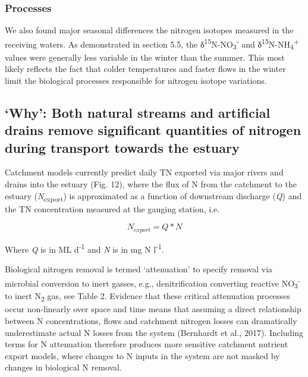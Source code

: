\documentclass[
]{book}
\begin{document}
\hypertarget{processes}{%
\subsubsection{Processes}\label{processes}}

We also found major seasonal differences the nitrogen isotopes measured in the receiving waters. As demonstrated in section 5.5, the δ\textsuperscript{15}N-NO\textsubscript{3}\textsuperscript{-} and δ\textsuperscript{15}N-NH\textsubscript{4}\textsuperscript{+} values were generally less variable in the winter than the summer. This most likely reflects the fact that colder temperatures and faster flows in the winter limit the biological processes responsible for nitrogen isotope variations.~

\hypertarget{why-both-natural-streams-and-artificial-drains-remove-significant-quantities-of-nitrogen-during-transport-towards-the-estuary}{%
\subsection{`Why': Both natural streams and artificial drains remove significant quantities of nitrogen during transport towards the estuary}\label{why-both-natural-streams-and-artificial-drains-remove-significant-quantities-of-nitrogen-during-transport-towards-the-estuary}}

Catchment models currently predict daily TN exported via major rivers and drains into the estuary (Fig. 12), where the flux of N from the catchment to the estuary (\emph{N}\textsubscript{export}) is approximated as a function of downstream discharge (\emph{Q}) and the TN concentration measured at the gauging station, i.e.~

\[
N_{export} = Q*N
\]

Where \emph{Q} is in ML d\textsuperscript{-1} and \emph{N} is in mg N l\textsuperscript{-1}.~

Biological nitrogen removal is termed `attenuation' to specify removal via microbial conversion to inert gasses, e.g., denitrification converting reactive NO\textsubscript{3}\textsuperscript{-} to inert N\textsubscript{2} gas, see Table 2. Evidence that these critical attenuation processes occur non-linearly over space and time means that assuming a direct relationship between N concentrations, flows and catchment nitrogen losses can dramatically underestimate actual N losses from the system (Bernhardt et al., 2017). Including terms for N attenuation therefore produces more sensitive catchment nutrient export models, where changes to N inputs in the system are not masked by changes in biological N removal.
\end{document}
